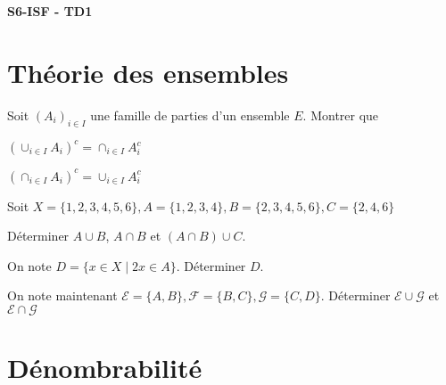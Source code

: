 \documentclass[french]{report}
\begin{document}
\begin{center}
    \huge{\textbf{S6-ISF - TD1}}
\end{center}

\section*{Théorie des ensembles}

\begin{exo}
    Soit \((A_i)_{i\in I}\) une famille de parties d'un ensemble \(E\). Montrer que
    \begin{q}{1}
        \(\left(\cup_{i\in I}A_i\right)^c = \cap_{i\in I} A_i^c\)
    \end{q}
    \begin{q}{2}
        \(\left(\cap_{i\in I}A_i\right)^c = \cup_{i\in I} A_i^c\)
    \end{q}
\end{exo}

\begin{exo}
    Soit \(X=\{1,2,3,4,5,6\}, A=\{1,2,3,4\}, B=\{2,3,4,5,6\}, C=\{2,4,6\}\)
    \begin{q}{1}
        Déterminer \(A\cup B\), \(A\cap B\) et \(\left(A\cap B\right)\cup C\).
    \end{q}
    \begin{q}{2}
        On note \(D=\{x\in X\mid 2x\in A\}\). Déterminer \(D\).
    \end{q}
    \begin{q}{3}
        On note maintenant \(\mathcal{E}=\{A,B\}, \mathcal{F}=\{B,C\}, \mathcal{G}=\{C,D\}.\)
        Déterminer \(\mathcal{E}\cup\mathcal{G}\) et \(\mathcal{E}\cap\mathcal{G}\)
    \end{q}
\end{exo}

\section*{Dénombrabilité}
\end{document}
